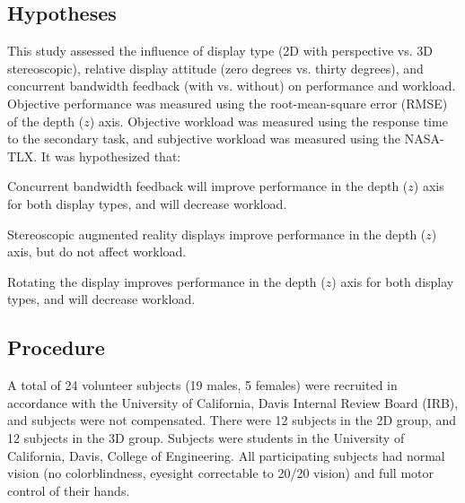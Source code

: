 \subsection{Hypotheses}
This study assessed the influence of display type (2D with perspective vs. 3D stereoscopic), relative display attitude (zero degrees vs. thirty degrees), and concurrent bandwidth feedback (with vs. without) on performance and workload.
Objective performance was measured using the root-mean-square error (RMSE) of the depth ($z$) axis.
Objective workload was measured using the response time to the secondary task, and subjective workload was measured using the NASA-TLX.
It was hypothesized that:
\begin{description}[align=left]
    \item [Hypothesis 1] Concurrent bandwidth feedback will improve performance in the depth ($z$) axis for both display types, and will decrease workload.
    \item [Hypothesis 2] Stereoscopic augmented reality displays improve performance in the depth ($z$) axis, but do not affect workload.
    \item [Hypothesis 3] Rotating the display improves performance in the depth ($z$) axis for both display types, and will decrease workload.
\end{description}

\subsection{Procedure}
A total of 24 volunteer subjects (19 males, 5 females) were recruited in accordance with the University of California, Davis Internal Review Board (IRB), and subjects were not compensated.
There were 12 subjects in the 2D group, and 12 subjects in the 3D group.
Subjects were students in the University of California, Davis, College of Engineering.
All participating subjects had normal vision (no colorblindness, eyesight correctable to 20/20 vision) and full motor control of their hands.

